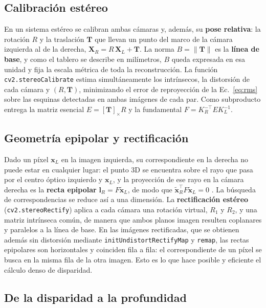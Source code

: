 \documentclass[10pt,a4paper,twocolumn]{article}
\newcommand{\T}{^{\top}}
\newcommand{\code}[1]{\texttt{#1}}
\begin{document}
\subsection{Calibración estéreo}
\label{sec:stereo-calib}

En un sistema estéreo se calibran ambas cámaras y, además, su \textbf{pose relativa}: la rotación $R$ y la traslación $\mathbf{T}$ que llevan un punto del marco de la cámara izquierda al de la derecha, $\mathbf{X}_R=R\,\mathbf{X}_L+\mathbf{T}$. La norma $B=\lVert\mathbf{T}\rVert$ es la \textbf{línea de base}, y como el tablero se describe en milímetros, $B$ queda expresada en esa unidad y fija la escala métrica de toda la reconstrucción. La función \code{cv2.stereoCalibrate} estima simultáneamente los intrínsecos, la distorsión de cada cámara y $(R,\mathbf{T})$, minimizando el error de reproyección de la Ec.~\eqref{eq:rms} sobre las esquinas detectadas en ambas imágenes de cada par. Como subproducto entrega la matriz esencial $E=[\mathbf{T}]_\times R$ y la fundamental $F=K_R^{-\top}EK_L^{-1}$.

\subsection{Geometría epipolar y rectificación}
\label{sec:epipolar}

Dado un píxel $\mathbf{x}_L$ en la imagen izquierda, su correspondiente en la derecha no puede estar en cualquier lugar: el punto 3D se encuentra sobre el rayo que pasa por el centro óptico izquierdo y $\mathbf{x}_L$, y la proyección de ese rayo en la cámara derecha es la \textbf{recta epipolar} $\mathbf{l}_R=F\tilde{\mathbf{x}}_L$, de modo que $\tilde{\mathbf{x}}_R\T F\tilde{\mathbf{x}}_L=0$ \cite{hz}. La búsqueda de correspondencias se reduce así a una dimensión. La \textbf{rectificación estéreo} (\code{cv2.stereoRectify}) aplica a cada cámara una rotación virtual, $R_1$ y $R_2$, y una matriz intrínseca común, de manera que ambos planos imagen resulten coplanares y paralelos a la línea de base. En las imágenes rectificadas, que se obtienen además sin distorsión mediante \code{initUndistortRectifyMap} y \code{remap}, las rectas epipolares son horizontales y coinciden fila a fila: el correspondiente de un píxel se busca en la misma fila de la otra imagen. Esto es lo que hace posible y eficiente el cálculo denso de disparidad.

\subsection{De la disparidad a la profundidad}
\label{sec:disparidad}
\end{document}
